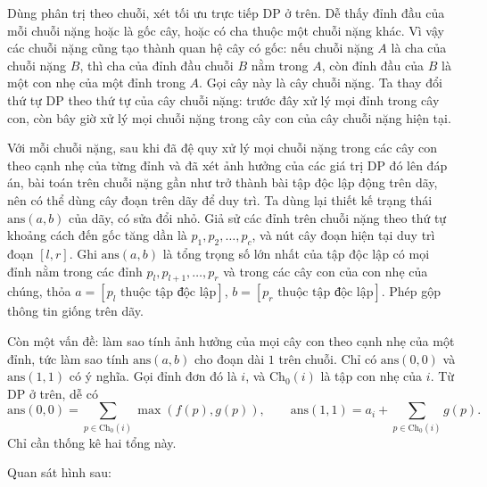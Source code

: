\documentclass[11pt]{article}
\begin{document}
Dùng phân trị theo chuỗi, xét tối ưu trực tiếp DP ở trên. Dễ thấy đỉnh đầu của
mỗi chuỗi nặng hoặc là gốc cây, hoặc có cha thuộc một chuỗi nặng khác. Vì vậy
các chuỗi nặng cũng tạo thành quan hệ cây có gốc: nếu chuỗi nặng \(A\) là cha
của chuỗi nặng \(B\), thì cha của đỉnh đầu chuỗi \(B\) nằm trong \(A\), còn
đỉnh đầu của \(B\) là một con nhẹ của một đỉnh trong \(A\). Gọi cây này là cây
chuỗi nặng. Ta thay đổi thứ tự DP theo thứ tự của cây chuỗi nặng: trước đây
xử lý mọi đỉnh trong cây con, còn bây giờ xử lý mọi chuỗi nặng trong cây con
của cây chuỗi nặng hiện tại.

Với mỗi chuỗi nặng, sau khi đã đệ quy xử lý mọi chuỗi nặng trong các cây con
theo cạnh nhẹ của từng đỉnh và đã xét ảnh hưởng của các giá trị DP đó lên đáp
án, bài toán trên chuỗi nặng gần như trở thành bài tập độc lập động trên dãy,
nên có thể dùng cây đoạn trên dãy để duy trì. Ta dùng lại thiết kế trạng thái
\(\mathrm{ans}(a,b)\) của dãy, có sửa đổi nhỏ. Giả sử các đỉnh trên chuỗi nặng
theo thứ tự khoảng cách đến gốc tăng dần là \(p_1,p_2,\ldots,p_c\), và nút cây
đoạn hiện tại duy trì đoạn \([l,r]\). Ghi \(\mathrm{ans}(a,b)\) là tổng trọng
số lớn nhất của tập độc lập có mọi đỉnh nằm trong các đỉnh
\(p_l,p_{l+1},\ldots,p_r\) và trong các cây con của con nhẹ của chúng, thỏa
\(a=[p_l\text{ thuộc tập độc lập}]\), \(b=[p_r\text{ thuộc tập độc lập}]\).
Phép gộp thông tin giống trên dãy.

Còn một vấn đề: làm sao tính ảnh hưởng của mọi cây con theo cạnh nhẹ của một
đỉnh, tức làm sao tính \(\mathrm{ans}(a,b)\) cho đoạn dài \(1\) trên chuỗi.
Chỉ có \(\mathrm{ans}(0,0)\) và \(\mathrm{ans}(1,1)\) có ý nghĩa. Gọi đỉnh đơn
đó là \(i\), và \(\mathrm{Ch}_0(i)\) là tập con nhẹ của \(i\). Từ DP ở trên,
dễ có
\[
  \mathrm{ans}(0,0)=\sum_{p\in\mathrm{Ch}_0(i)}\max(f(p),g(p)),
  \qquad
  \mathrm{ans}(1,1)=a_i+\sum_{p\in\mathrm{Ch}_0(i)}g(p).
\]
Chỉ cần thống kê hai tổng này.

Quan sát hình sau:

\begin{center}
\end{center}
\end{document}

